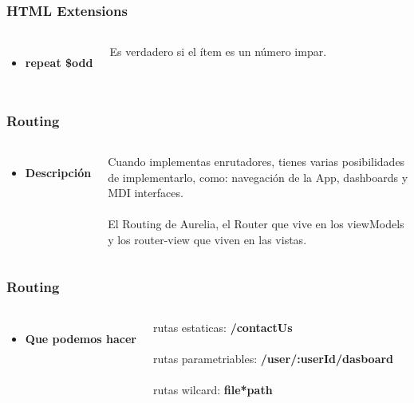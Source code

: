 \documentclass{beamer}
\begin{document}
\begin{frame}
\frametitle{HTML Extensions}
\begin{columns}[c]
\begin{itemize}
\item \textbf{repeat \$odd}
\end{itemize}
Es verdadero si el \'item es un n\'umero impar.
\end{columns}
\end{frame}
\begin{frame}
\frametitle{Routing}
\begin{columns}[c]
\begin{itemize}
\item \textbf{Descripci\'on}
\end{itemize}
Cuando implementas enrutadores, tienes varias posibilidades de implementarlo, como: navegaci\'on de la App, dashboards y MDI interfaces.
\\~\\
El Routing de Aurelia, el Router que vive en los viewModels y los router-view que viven en las vistas.
\end{columns}
\end{frame}
\begin{frame}
\frametitle{Routing}
\begin{columns}[c]
\begin{itemize}
\item \textbf{Que podemos hacer}
\end{itemize}
rutas estaticas: \textbf{/contactUs}
\\~\\
rutas parametriables: \textbf{/user/:userId/dasboard}
\\~\\
rutas wilcard: \textbf{file*path}
\end{columns}
\end{frame}
\end{document}
